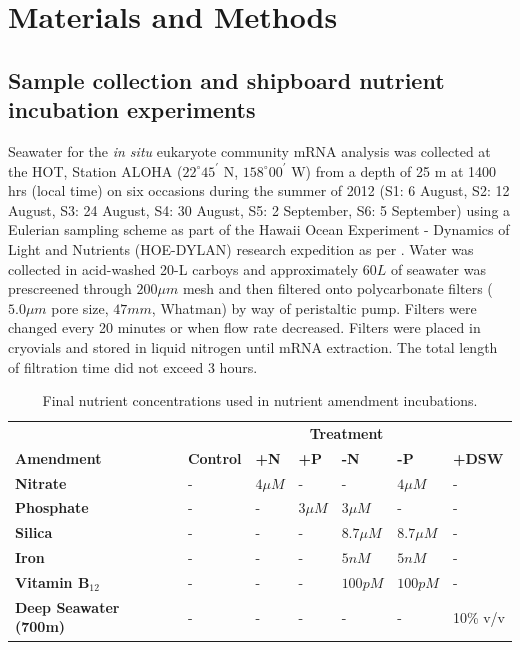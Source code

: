 \section{Materials and Methods}

\subsection{Sample collection and shipboard nutrient incubation experiments}
Seawater for the \textit{in situ} eukaryote community mRNA analysis was collected at the HOT, Station ALOHA ($22^\circ 45^\prime$ N, $158^\circ 00^\prime$ W) from a depth of 25 m at 1400 hrs (local time) on six occasions during the summer of 2012 (S1: 6 August, S2: 12 August, S3: 24 August, S4: 30 August, S5: 2 September, S6: 5 September) using a Eulerian sampling scheme as part of the Hawaii Ocean Experiment - Dynamics of Light and Nutrients (HOE-DYLAN) research expedition as per \citet{Alexander2015a}. Water was collected in acid-washed 20-L carboys and approximately $60 L$ of seawater was prescreened through $200 \mu m$ mesh and then filtered onto polycarbonate filters ($5.0 \mu m$ pore size, $47 mm$, Whatman) by way of peristaltic pump. Filters were changed every 20 minutes or when flow rate decreased. Filters were placed in cryovials and stored in liquid nitrogen until mRNA extraction. The total length of filtration time did not exceed 3 hours. \par

\begin{table}[b]
\centering
\caption{Final nutrient concentrations used in nutrient amendment incubations.}
\label{tab:c5t1}
\small
\begin{tabular}{lllllll}
                              & \multicolumn{6}{c}{\textbf{Treatment}}                                                   \\ 
\textbf{Amendment}            & \textbf{Control} & \textbf{+N} & \textbf{+P} & \textbf{-N} & \textbf{-P} & \textbf{+DSW} \\ \Xhline{2\arrayrulewidth}
\textbf{Nitrate}              & -                & $4 \mu M$   & -           & -           & $4 \mu M$   & -             \\ 
\textbf{Phosphate}            & -                & -           & $3 \mu M$   & $3 \mu M$   & -           & -             \\ 
\textbf{Silica}               & -                & -           & -           & $8.7 \mu M$ & $8.7 \mu M$ & -             \\ 
\textbf{Iron}                 & -                & -           & -           & $5 nM$      & $5 nM$      & -             \\ 
\textbf{Vitamin B$_{12}$}     & -                & -           & -           & $100 pM$    & $100 pM$    & -             \\ 
\textbf{Deep Seawater (700m)} & -                & -           & -           & -           & -           & 10\% v/v      \\ 
\end{tabular}
\end{table}



